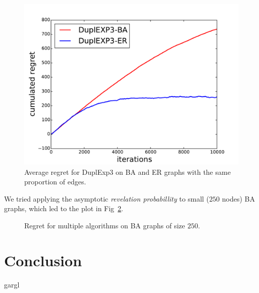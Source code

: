 \documentclass[10pt,a4paper]{scrartcl}
\begin{document}
\begin{figure}[h!]
 \includegraphics{figures/50compare_dupl_er_ba.pdf}
 \caption{Average regret for DuplExp3 on BA and ER graphs with the same proportion of edges.}
 \label{dupl_er_ba}
\end{figure}

We tried applying the asymptotic \emph{revelation probabillity} to small ($250$ nodes) BA graphs, which led to the plot in Fig~\ref{dupl_ba_finite_ba}.

\begin{figure}[h!]
 \caption{Regret for multiple algorithms on BA graphs of size $250$.}
 \label{dupl_ba_finite_ba}
\end{figure}


\section{Conclusion}
gargl



\end{document}
